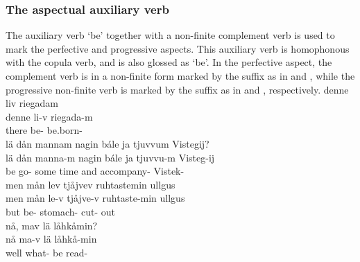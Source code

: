 \subsubsection{The aspectual auxiliary verb }\label{auxV}
The auxiliary verb  ‘be’ %
together with a non-finite complement verb is used to mark the perfective and progressive aspects. This auxiliary verb is homophonous with the copula verb, and is also glossed as ‘be’.
In the perfective aspect, the complement verb is in a non-finite form marked by the suffix  as in  and , while the progressive non-finite verb is marked by the suffix  %
as in  and , respectively.
\ea\label{perfClause1}%
\glll	denne liv riegadam\\
	denne li-v riegada-m\\
	there be- be.born-\\\nopagebreak
{} 
\z
\ea\label{perfClause2}%
\glll	lä dån mannam nagin bále ja tjuvvum Vistegij?\\
	lä dån manna-m nagin bále ja tjuvvu-m Visteg-ij\\
	be\BS{}  go- some time\BS{} and accompany- Vistek-\\\nopagebreak
{} 
\z
\ea\label{progClause1}%
\glll	men mån lev tjåjvev ruhtastemin ullgus\\
	men mån le-v tjåjve-v ruhtaste-min ullgus\\
	but  be- stomach- cut- out\\\nopagebreak
{} 
\z
\ea\label{progClause2}
\glll	nå, mav lä låhkåmin?\\
	nå ma-v lä låhkå-min\\
	well what- be\BS{} read-\\\nopagebreak
{} 
\z


